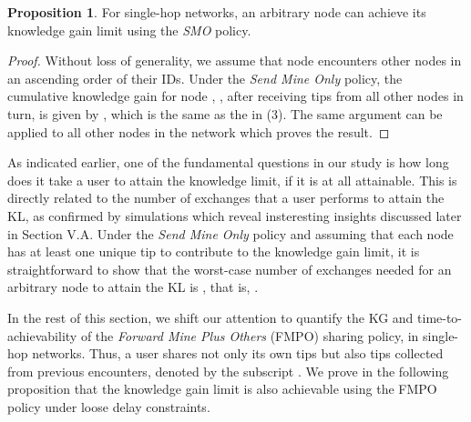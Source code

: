 \documentclass[conference]{IEEEtran}
\theoremstyle{definition}
\newtheorem{prop}{Proposition}
\begin{document}
\begin{prop}
For single-hop networks, an arbitrary node can achieve its knowledge gain limit using the {\it SMO} policy.
\end{prop}
\vspace{-0.1 cm}
\begin{proof}
Without loss of generality, we assume that node  encounters other nodes in an ascending order of their IDs. Under the {\it Send Mine Only} policy, 
the cumulative knowledge gain for node , , after receiving tips from all other nodes  in turn, is given by , which is the same as the  in (3). 
The same argument can be applied to all other nodes in the network which proves the result.
\end{proof}



As indicated earlier, one of the fundamental questions in our study is how long does it take a user to attain the knowledge limit, if it is at all attainable. This is directly related to the number of exchanges that a user performs to attain the KL, as confirmed by simulations which reveal insteresting insights discussed later in Section V.A. Under the {\it Send Mine Only} policy and assuming that each node has at least one unique tip to contribute to the knowledge gain limit, it is straightforward to show that the worst-case number of exchanges needed for an arbitrary node to attain the KL is , that is, .


In the rest of this section, we shift our attention to quantify the KG and time-to-achievability of the {\it Forward Mine Plus Others} (FMPO) sharing policy, in single-hop networks. Thus, a user shares not only its own tips but also tips collected from previous encounters, denoted by the subscript . We prove in the following proposition that the knowledge gain limit is also achievable using the FMPO policy under loose delay constraints.
\end{document}

